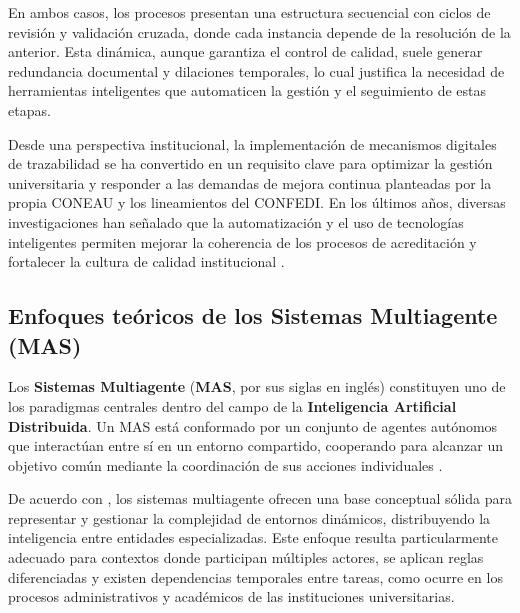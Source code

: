 \documentclass[12pt]{article}
\let\cite\citep
\begin{document}
En ambos casos, los procesos presentan una estructura secuencial con ciclos de revisión y validación cruzada, donde cada instancia depende de la resolución de la anterior. Esta dinámica, aunque garantiza el control de calidad, suele generar redundancia documental y dilaciones temporales, lo cual justifica la necesidad de herramientas inteligentes que automaticen la gestión y el seguimiento de estas etapas.

Desde una perspectiva institucional, la implementación de mecanismos digitales de trazabilidad se ha convertido en un requisito clave para optimizar la gestión universitaria y responder a las demandas de mejora continua planteadas por la propia CONEAU y los lineamientos del CONFEDI. En los últimos años, diversas investigaciones han señalado que la automatización y el uso de tecnologías inteligentes permiten mejorar la coherencia de los procesos de acreditación y fortalecer la cultura de calidad institucional \cite{farsane2025automatizacion, duarte2023literature}.




\subsection{Enfoques teóricos de los Sistemas Multiagente (MAS)}

Los \textbf{Sistemas Multiagente} (\textbf{MAS}, por sus siglas en inglés) constituyen uno de los paradigmas centrales dentro del campo de la \textbf{Inteligencia Artificial Distribuida}. Un MAS está conformado por un conjunto de agentes autónomos que interactúan entre sí en un entorno compartido, cooperando para alcanzar un objetivo común mediante la coordinación de sus acciones individuales \cite{perez2022breve}. 

De acuerdo con \cite{sakurada2021multi}, los sistemas multiagente ofrecen una base conceptual sólida para representar y gestionar la complejidad de entornos dinámicos, distribuyendo la inteligencia entre entidades especializadas. Este enfoque resulta particularmente adecuado para contextos donde participan múltiples actores, se aplican reglas diferenciadas y existen dependencias temporales entre tareas, como ocurre en los procesos administrativos y académicos de las instituciones universitarias.
\end{document}
